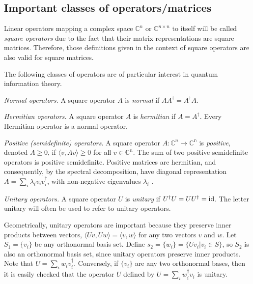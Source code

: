 \subsection{Important classes of operators/matrices}

Linear operators mapping a complex space $\mathbb{C}^{n}$ or $\mathbb{C}^{n\times n}$  to itself will be called \emph{square operators} due to the fact that their matrix representations are square matrices. Therefore, those definitions given in the context of square operators are also valid for square matrices.

The following classes of operators are of particular interest in quantum information theory.

\begin{definition}
  \emph{Normal operators.} A square operator $A$ is \emph{normal} if $AA^{\dagger} = A^{\dagger}A$.
\end{definition}

\begin{definition} \label{def:hermitian}
  \emph{Hermitian operators.} A square operator $A$ is \emph{hermitian} if $A = A^{\dagger}$. Every Hermitian operator is a normal operator.
\end {definition}

\begin{definition} \label{def:positive}
  \emph{Positive (semidefinite) operators}. A square operator $A:\mathbb{C}^{n} \rightarrow \mathbb{C^{n}}$ is \emph{positive}, denoted $A \geq 0$, if $\langle v, Av \rangle \geq 0$ for all $v \in \mathbb{C}^{n}$.  The sum of two positive semidefinite operators is positive semidefinite. Positive matrices are hermitian, and consequently, by the spectral decomposition, have diagonal representation $A =  \sum_i \lambda_i v_i v_i^{\dag}$, with non-negative eigenvalues $\lambda_i$ \cite{nielsen2010quantum}.

\end{definition}

\begin{definition}
  \emph{Unitary operators.} A square operator $U$ is \emph{unitary} if $U^{\dagger}U = UU^{\dagger} = \mathrm{id}$. The letter \gls{unitary} will often be used to refer to unitary
  operators.
\end{definition}
Geometrically, unitary operators are important because they preserve inner products between vectors, $\langle U v, U w \rangle = \langle v, w \rangle$  for any two vectors $v$ and $w$. Let $S_1=\{v_i\}$ be any orthonormal basis set. Define $ s_2= \{w_i\} = \{U v_i | v_i \in S \}$, so $S_2$ is also an orthonormal basis set, since unitary operators preserve inner products. Note that $U = \sum_{i} w_i v_i^{\dag}$. Conversely, if $\{v_i\}$ are any two orthonormal bases, then it is easily checked that
the operator $U$ defined by $U = \sum_{i} w_i^{\dag} v_i$ is unitary.

